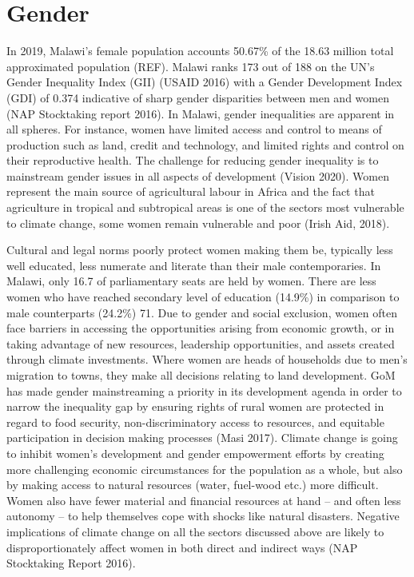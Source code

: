 \documentclass[
]{book}
\begin{document}
\hypertarget{gender}{%
\section{Gender}\label{gender}}

In 2019, Malawi's female population accounts 50.67\% of the 18.63 million total approximated population (REF). Malawi ranks 173 out of 188 on the UN's Gender Inequality Index (GII) (USAID 2016) with a Gender Development Index (GDI) of 0.374 indicative of sharp gender disparities between men and women (NAP Stocktaking report 2016). In Malawi, gender inequalities are apparent in all spheres. For instance, women have limited access and control to means of production such as land, credit and technology, and limited rights and control on their reproductive health. The challenge for reducing gender inequality is to mainstream gender issues in all aspects of development (Vision 2020). Women represent the main source of agricultural labour in Africa and the fact that agriculture in tropical and subtropical areas is one of the sectors most vulnerable to climate change, some women remain vulnerable and poor (Irish Aid, 2018).

Cultural and legal norms poorly protect women making them be, typically less well educated, less numerate and literate than their male contemporaries. In Malawi, only 16.7 of parliamentary seats are held by women. There are less women who have reached secondary level of education (14.9\%) in comparison to male counterparts (24.2\%) 71. Due to gender and social exclusion, women often face barriers in accessing the opportunities arising from economic growth, or in taking advantage of new resources, leadership opportunities, and assets created through climate investments. Where women are heads of households due to men's migration to towns, they make all decisions relating to land development. GoM has made gender mainstreaming a priority in its development agenda in order to narrow the inequality gap by ensuring rights of rural women are protected in regard to food security, non-discriminatory access to resources, and equitable participation in decision making processes (Masi 2017).
Climate change is going to inhibit women's development and gender empowerment efforts by creating more challenging economic circumstances for the population as a whole, but also by making access to natural resources (water, fuel-wood etc.) more difficult. Women also have fewer material and financial resources at hand -- and often less autonomy -- to help themselves cope with shocks like natural disasters. Negative implications of climate change on all the sectors discussed above are likely to disproportionately affect women in both direct and indirect ways (NAP Stocktaking Report 2016).
\end{document}

